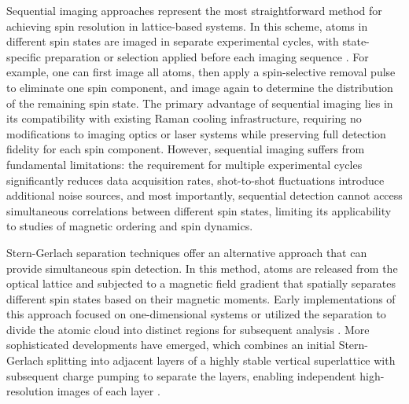 Sequential imaging approaches represent the most straightforward method for achieving spin resolution in lattice-based systems. In this scheme, atoms in different spin states are imaged in separate experimental cycles, with state-specific preparation or selection applied before each imaging sequence \cite{boll_spin-_2016,parsons_site-resolved_2016}. For example, one can first image all atoms, then apply a spin-selective removal pulse to eliminate one spin component, and image again to determine the distribution of the remaining spin state. The primary advantage of sequential imaging lies in its compatibility with existing Raman cooling infrastructure, requiring no modifications to imaging optics or laser systems while preserving full detection fidelity for each spin component. However, sequential imaging suffers from fundamental limitations: the requirement for multiple experimental cycles significantly reduces data acquisition rates, shot-to-shot fluctuations introduce additional noise sources, and most importantly, sequential detection cannot access simultaneous correlations between different spin states, limiting its applicability to studies of magnetic ordering and spin dynamics.

Stern-Gerlach separation techniques offer an alternative approach that can provide simultaneous spin detection. In this method, atoms are released from the optical lattice and subjected to a magnetic field gradient that spatially separates different spin states based on their magnetic moments. Early implementations of this approach focused on one-dimensional systems or utilized the separation to divide the atomic cloud into distinct regions for subsequent analysis \cite{boll_spin_2016}. More sophisticated developments have emerged, which combines an initial Stern-Gerlach splitting into adjacent layers of a highly stable vertical superlattice with subsequent charge pumping to separate the layers, enabling independent high-resolution images of each layer \cite{koepsell_robust_2020}.


